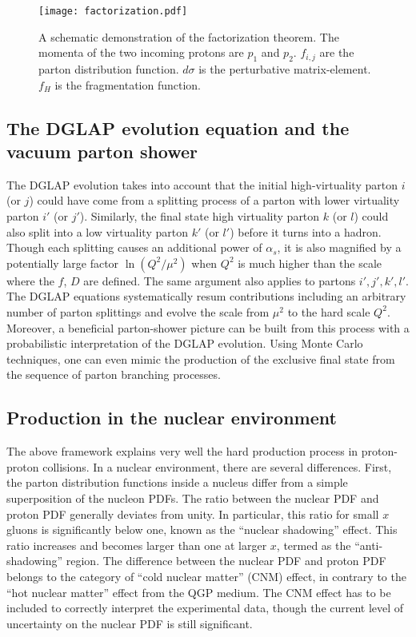 \begin{figure}
\singlespacing
\centering
\texttt{[image: factorization.pdf]}
\caption[A schematic demonstration of the factorization theorem. The]{A schematic demonstration of the factorization theorem. The momenta of the two incoming protons are $p_1$ and $p_2$. $f_{i,j}$ are the parton distribution function. $d\sigma$ is the perturbative matrix-element. $f_H$ is the fragmentation function.}
\label{fig:factorization}
\end{figure}

\subsection{The DGLAP evolution equation and the vacuum parton shower} The DGLAP evolution takes into account that the initial high-virtuality parton $i$ (or $j$) could have come from a splitting process of a parton with lower virtuality parton $i'$ (or $j'$).
Similarly, the final state high virtuality parton $k$ (or $l$) could also split into a low virtuality parton $k'$ (or $l'$) before it turns into a hadron.
Though each splitting causes an additional power of $\alpha_s$, it is also magnified by a potentially large factor $\ln (Q^2/\mu^2)$ when $Q^2$ is much higher than the scale where the $f$, $D$ are defined.
The same argument also applies to partons $i', j', k', l'$. 
The DGLAP equations systematically resum contributions including an arbitrary number of parton splittings and evolve the scale from $\mu^2$ to the hard scale $Q^2$.
Moreover, a beneficial parton-shower picture can be built from this process with a probabilistic interpretation of the DGLAP evolution. Using Monte Carlo techniques, one can even mimic the production of the exclusive final state from the sequence of parton branching processes.

\subsection{Production in the nuclear environment}
The above framework explains very well the hard production process in proton-proton collisions.
In a nuclear environment, there are several differences.
First, the parton distribution functions inside a nucleus differ from a simple superposition of the nucleon PDFs.
The ratio between the nuclear PDF and proton PDF generally deviates from unity.
In particular, this ratio for small $x$ gluons is significantly below one, known as the ``nuclear shadowing'' effect. 
This ratio increases and becomes larger than one at larger $x$, termed as the ``anti-shadowing'' region.
The difference between the nuclear PDF and proton PDF belongs to the category of ``cold nuclear matter'' (CNM) effect, in contrary to the ``hot nuclear matter'' effect from the QGP medium.
The CNM effect has to be included to correctly interpret the experimental data, though the current level of uncertainty on the nuclear PDF is still significant.

